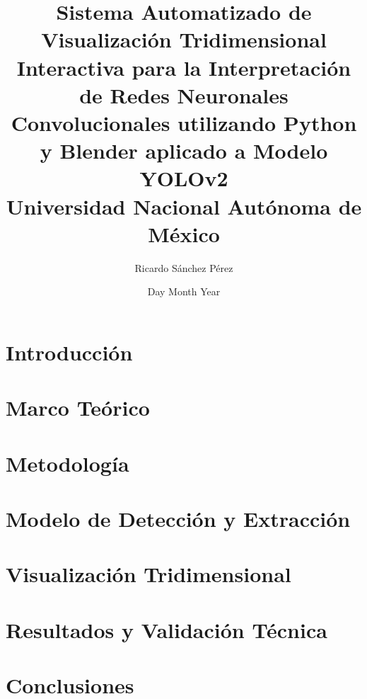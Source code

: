 \documentclass[12pt, letterpaper, twoside, final]{book}
\title{
{Sistema Automatizado de Visualización Tridimensional Interactiva para la
Interpretación de Redes Neuronales Convolucionales utilizando Python y Blender
aplicado a Modelo YOLOv2
}\\
{\large Universidad Nacional Autónoma de México}\\
}
\author{Ricardo Sánchez Pérez}
\date{Day Month Year}
\begin{document}
\maketitle
\tableofcontents
\listoffigures

\chapter{Introducción}


\chapter{Marco Teórico}


\chapter{Metodología}


\chapter{Modelo de Detección y Extracción}


\chapter{Visualización Tridimensional}


\chapter{Resultados y Validación Técnica}


\chapter{Conclusiones}


\appendix


\printbibliography[title={Referencias}, notkeyword={extra}]

\nocite{*}
\printbibliography[title={Bibliografía}, keyword={extra}]
\end{document}
